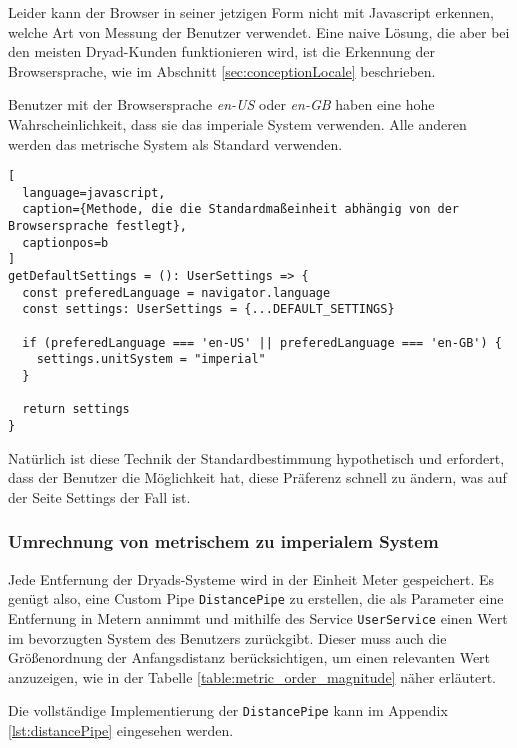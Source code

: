 Leider kann der Browser in seiner jetzigen Form nicht mit Javascript erkennen, welche Art von Messung der Benutzer verwendet.
Eine naive Lösung, die aber bei den meisten Dryad-Kunden funktionieren wird, ist die Erkennung der Browsersprache, wie im Abschnitt \ref{sec:conceptionLocale} beschrieben.

Benutzer mit der Browsersprache \textit{en-US} oder \textit{en-GB} haben eine hohe Wahrscheinlichkeit, dass sie das imperiale System verwenden.
Alle anderen werden das metrische System als Standard verwenden.

\begin{lstlisting}[
  language=javascript,
  caption={Methode, die die Standardmaßeinheit abhängig von der Browsersprache festlegt},
  captionpos=b
]
getDefaultSettings = (): UserSettings => {
  const preferedLanguage = navigator.language
  const settings: UserSettings = {...DEFAULT_SETTINGS}

  if (preferedLanguage === 'en-US' || preferedLanguage === 'en-GB') {
    settings.unitSystem = "imperial"
  }

  return settings
}
\end{lstlisting}

Natürlich ist diese Technik der Standardbestimmung hypothetisch und erfordert, dass der Benutzer die Möglichkeit hat, diese Präferenz schnell zu ändern, was auf der Seite Settings der Fall ist.

\subsubsection{Umrechnung von metrischem zu imperialem System}

Jede Entfernung der Dryads-Systeme wird in der Einheit Meter gespeichert.
Es genügt also, eine Custom Pipe \lstinline{DistancePipe} zu erstellen, die als Parameter eine Entfernung in Metern annimmt und mithilfe des Service \lstinline{UserService} einen Wert im bevorzugten System des Benutzers zurückgibt.
Dieser muss auch die Größenordnung der Anfangsdistanz berücksichtigen, um einen relevanten Wert anzuzeigen, wie in der Tabelle \ref{table:metric_order_magnitude} näher erläutert.

Die vollständige Implementierung der \lstinline{DistancePipe} kann im Appendix \ref{lst:distancePipe} eingesehen werden.

